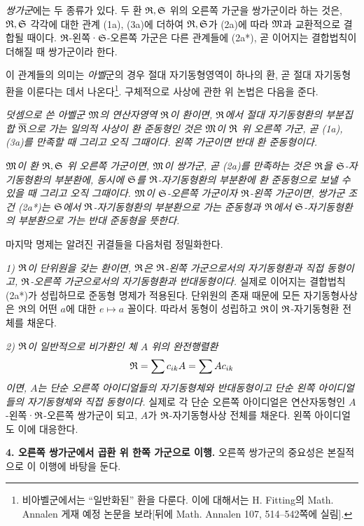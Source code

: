\emph{쌍가군}에는 두 종류가 있다. 두 환 \(\mathfrak R,\mathfrak S\) 위의 오른쪽 가군을 쌍가군이라 하는 것은, \(\mathfrak R,\mathfrak S\) 각각에 대한 관계 (1a), (3a)에 더하여 \(\mathfrak R,\mathfrak S\)가 (2a)에 따라 \(\mathfrak M\)과 교환적으로 결합될 때이다. \(\mathfrak R\)-왼쪽·\(\mathfrak S\)-오른쪽 가군은 다른 관계들에 (2a*), 곧 이어지는 결합법칙이 더해질 때 쌍가군이라 한다.

이 관계들의 의미는 \emph{아벨}군의 경우 절대 자기동형영역이 하나의 환, 곧 절대 자기동형환을 이룬다는 데서 나온다\footnote{비아벨군에서는 “일반화된” 환을 다룬다. 이에 대해서는 H. Fitting의 Math. Annalen 게재 예정 논문을 보라[뒤에 Math. Annalen 107, 514--542쪽에 실림].}. 구체적으로 사상에 관한 위 논법은 다음을 준다.

\emph{덧셈으로 쓴 아벨군 \(\mathfrak M\)의 연산자영역 \(\mathfrak R\)이 환이면, \(\mathfrak R\)에서 절대 자기동형환의 부분집합 \(\overline{\mathfrak R}\)으로 가는 일의적 사상이 환 준동형인 것은 \(\mathfrak M\)이 \(\mathfrak R\) 위 오른쪽 가군, 곧 (1a), (3a)를 만족할 때 그리고 오직 그때이다. 왼쪽 가군이면 반대 환 준동형이다.}

\emph{\(\mathfrak M\)이 환 \(\mathfrak R,\mathfrak S\) 위 오른쪽 가군이면, \(\mathfrak M\)이 쌍가군, 곧 (2a)를 만족하는 것은 \(\mathfrak R\)을 \(\mathfrak S\)-자기동형환의 부분환에, 동시에 \(\mathfrak S\)를 \(\mathfrak R\)-자기동형환의 부분환에 환 준동형으로 보낼 수 있을 때 그리고 오직 그때이다. \(\mathfrak M\)이 \(\mathfrak S\)-오른쪽 가군이자 \(\mathfrak R\)-왼쪽 가군이면, 쌍가군 조건 (2a*)는 \(\mathfrak S\)에서 \(\mathfrak R\)-자기동형환의 부분환으로 가는 준동형과 \(\mathfrak R\)에서 \(\mathfrak S\)-자기동형환의 부분환으로 가는 반대 준동형을 뜻한다.}

마지막 명제는 알려진 귀결들을 다음처럼 정밀화한다.

\emph{1) \(\mathfrak R\)이 단위원을 갖는 환이면, \(\mathfrak R\)은 \(\mathfrak R\)-왼쪽 가군으로서의 자기동형환과 직접 동형이고, \(\mathfrak R\)-오른쪽 가군으로서의 자기동형환과 반대동형이다.} 실제로 이어지는 결합법칙 (2a*)가 성립하므로 준동형 명제가 적용된다. 단위원의 존재 때문에 모든 자기동형사상은 \(\mathfrak R\)의 어떤 \(a\)에 대한 \(e\mapsto a\) 꼴이다. 따라서 동형이 성립하고 \(\mathfrak R\)이 \(\mathfrak R\)-자기동형환 전체를 채운다.

\emph{2) \(\mathfrak R\)이 일반적으로 비가환인 체 \(A\) 위의 완전행렬환}
\[
\mathfrak R=\sum c_{ik}A=\sum A c_{ik}
\]
\emph{이면, \(A\)는 단순 오른쪽 아이디얼들의 자기동형체와 반대동형이고 단순 왼쪽 아이디얼들의 자기동형체와 직접 동형이다.} 실제로 각 단순 오른쪽 아이디얼은 연산자동형인 \(A\)-왼쪽·\(\mathfrak R\)-오른쪽 쌍가군이 되고, \(A\)가 \(\mathfrak R\)-자기동형사상 전체를 채운다. 왼쪽 아이디얼도 이에 대응한다.

\noindent\textbf{4. 오른쪽 쌍가군에서 곱환 위 한쪽 가군으로 이행.} 오른쪽 쌍가군의 중요성은 본질적으로 이 이행에 바탕을 둔다.

